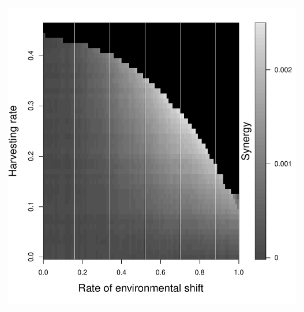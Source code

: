 \documentclass[12pt,english]{article}
\begin{document}
\begin{spacing}{1.9}
\begin{figure}[htbp]
\caption{%
}

\label{baseline}
\end{figure}

\pagebreak

\begin{figure}[htbp]
\begin{center}
\includegraphics[width=3in]{plots/synergy.pdf}
\caption{
}
\label{Synergy}
\end{center}
\end{figure}

\pagebreak



\pagebreak


\end{spacing}
\end{document}
